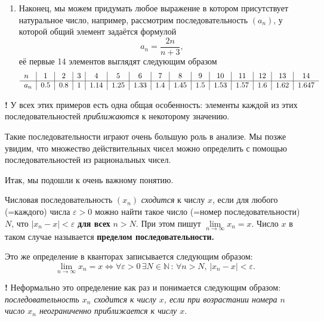 \begin{example}
\begin{enumerate}
    \item Наконец, мы можем придумать любое выражение в котором присутствует натуральное число, например, рассмотрим последовательность $(a_n)$, у которой общий элемент задаётся формулой
    \[
     a_n = \frac{2n}{n+3},
    \]
    её первые 14 элементов выглядят следующим образом
    \[
       \begin{tabular}{l|c|c|c|c|c|c|c|c|c|c|c|c|c|c}
             $n$ & 1&2&3&4&5&6&7&8&9&10&11&12&13&14  \\
             \hline
             $a_n$&  0.5 & 0.8 & 1 & 1.14 & 1.25 & 1.33& 1.4 & 1.45 & 1.5 & 1.53 & 1.57 & 1.6 & 1.62 & 1.647
         \end{tabular}
        \]
    \end{enumerate}
\end{example}

\begin{mydanger}{\bf {\color{red}!}}
 У всех этих примеров есть одна общая особенность: {\color{red}элементы каждой из этих последовательностей \textit{приближаются} к некоторому значению.}
\end{mydanger}

\begin{remark}
 Такие последовательности играют очень большую роль в анализе. Мы позже увидим, что множество действительных чисел можно определить с помощью последовательностей из рациональных чисел.
\end{remark}

Итак, мы подошли к очень важному понятию.

\begin{definition}\label{limit_of_seqeunce}
    Числовая последовательность $(x_n)$ \textit{сходится} к числу $x$, если для любого (=каждого) числа $\varepsilon>0$ можно найти такое число (=номер последовательности) $N$, что $|x_n -x|<\varepsilon$ {\color{red} \bf для всех} $n >N$. При этом пишут $\lim\limits_{n \to \infty} x_n = x$. Число $x$ в таком случае называется \textbf{пределом последовательности.}
\end{definition}

Это же определение в кванторах записывается следующим образом:
\[
 \boxed{
\lim_{n \to \infty } x_n = x \Longleftrightarrow  \forall \varepsilon >0\, \exists N \in \mathbb{N}\, :\, \forall n >N, \, |x_n - x| <\varepsilon.
}
\]

\begin{mydanger}{\bf{!}}
Неформально это определение как раз и понимается следующим образом: \textit{последовательность $x_n$ сходится к числу $x$, если при возрастании номера $n$ число $x_n$ неограниченно приближается к числу $x.$}
\end{mydanger}


